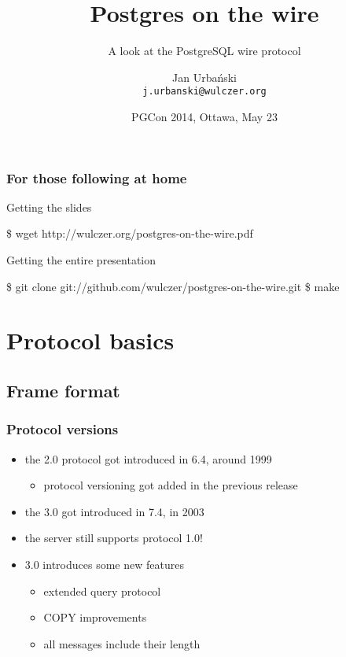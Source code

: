\documentclass{beamer}
\title{Postgres on the wire}
\subtitle{A look at the PostgreSQL wire protocol}
\author[Jan Urbański]{Jan Urbański \\ \texttt{j.urbanski@wulczer.org}}
\institute{Ducksboard}
\date[PGCon 2014]{PGCon 2014, Ottawa, May 23}
\begin{document}
\frame{\titlepage}

\begin{frame}[fragile]
  \frametitle{For those following at home}

  \begin{block}{Getting the slides}
    \begin{semiverbatim}
    \$ wget http://wulczer.org/postgres-on-the-wire.pdf
    \end{semiverbatim}
  \end{block}

  \begin{block}{Getting the entire presentation}
    \begin{semiverbatim}
    \$ git clone git://github.com/wulczer/postgres-on-the-wire.git
    \$ make
    \end{semiverbatim}
  \end{block}
\end{frame}

\begin{frame}
  \tableofcontents
\end{frame}

\section{Protocol basics}
\subsection{Frame format}

\begin{frame}
  \frametitle{Protocol versions}

  \begin{itemize}
  \item the 2.0 protocol got introduced in 6.4, around 1999
    \begin{itemize}
    \item protocol versioning got added in the previous release
    \end{itemize}
  \item the 3.0 got introduced in 7.4, in 2003
  \item the server still supports protocol 1.0!
  \item 3.0 introduces some new features
    \begin{itemize}
    \item extended query protocol
    \item COPY improvements
    \item all messages include their length
    \end{itemize}
  \end{itemize}
\end{frame}
\end{document}
